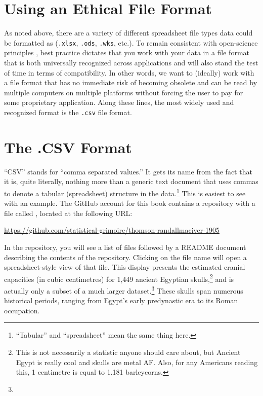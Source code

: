 \section{Using an Ethical File Format}
\label{sec:ethical_file}

As noted above, there are a variety of different spreadsheet file types data could be formatted as (\texttt{.xlsx}, \texttt{.ods}, \texttt{.wks}, etc.). To remain consistent with open-science principles \parencite{UNESCO_open_sci}, best practice dictates that you work with your data in a file format that is both universally recognized across applications and will also stand the test of time in terms of compatibility.  In other words, we want to (ideally) work with a file format that has no immediate risk of becoming obsolete and can be read by multiple computers on multiple platforms without forcing the user to pay for some proprietary application. Along these lines, the most widely used and recognized format is the \texttt{.csv} file format.

\section{The .CSV Format}

``CSV'' stands for ``comma separated values.'' It gets its name from the fact that it is, quite literally, nothing more than a generic text document that uses commas to denote a tabular (spreadsheet) structure in the data.\footnote{``Tabular'' and ``spreadsheet'' mean the same thing here.} This is easiest to see with an example. The GitHub account for this book contains a repository with a file called , located at the following URL:

\begin{center}
\url{https://github.com/statistical-grimoire/thomson-randallmaciver-1905}
\end{center}

\noindent
In the repository, you will see a list of files followed by a README document describing the contents of the repository. Clicking on the file name  will open a spreadsheet-style view of that file. This display presents the estimated cranial capacities (in cubic centimetres) for 1,449 ancient Egyptian skulls,\footnote{This is not necessarily a statistic anyone should care about, but Ancient Egypt is really cool and skulls are metal AF. Also, for any Americans reading this, 1 centimetre is equal to 1.181 barleycorns.} and is actually only a subset of a much larger dataset.\footnote{} These skulls span numerous historical periods, ranging from Egypt's early predynastic era to its Roman occupation.

